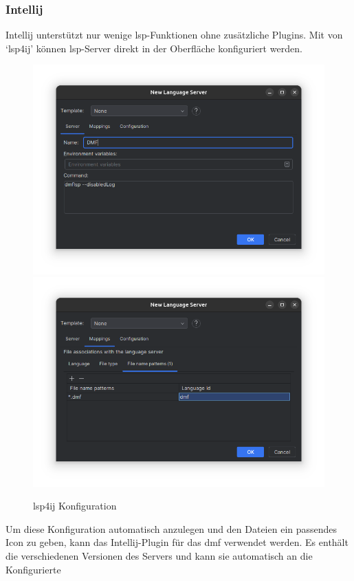 \documentclass[./einleitung.tex]{subfiles}
\begin{document}
    \subsubsection{Intellij}
    Intellij unterstützt nur wenige \acrshort{lsp}-Funktionen ohne zusätzliche Plugins.
    Mit von `lsp4ij' können \acrshort{lsp}-Server direkt in der Oberfläche konfiguriert werden.
    \begin{figure}
        \includegraphics[width=\linewidth / 2]{bilder/screenshot-add-lsp-lsp4ij}
        \includegraphics[width=\linewidth / 2]{bilder/screenshot-file-mapping}
        \caption{lsp4ij Konfiguration}
        \label{fig:screenshot-add-lsp-lsp4ij}
    \end{figure}
    Um diese Konfiguration automatisch anzulegen und den Dateien ein passendes Icon zu geben, kann das Intellij-Plugin für das \acrshort{dmf} verwendet werden.
    Es enthält die verschiedenen Versionen des Servers und kann sie automatisch an die Konfigurierte
\end{document}
